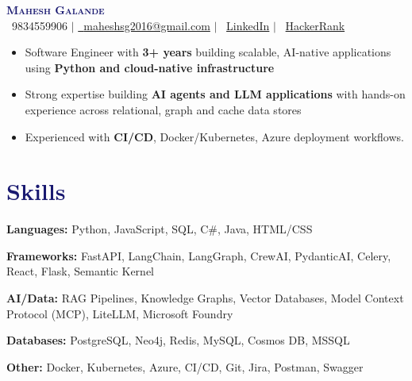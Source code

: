 \documentclass[letterpaper,11pt]{article}
\begin{document}
\begin{center}
    \textbf{\Huge \scshape \textcolor{MidnightBlue}{Mahesh Galande}} \\ \vspace{2pt}
    \small \faPhone\ {9834559906} $|$ \href{mailto:maheshsg2016@gmail.com}{\textcolor{BrickRed}{\faEnvelope\ {maheshsg2016@gmail.com}}} $|$ 
    \textcolor{BrickRed}{\faLinkedin\ \href{https://www.linkedin.com/in/mahesh-galande-235b09241/}{{LinkedIn}}} $|$ 
    \textcolor{BrickRed}{\faCode\ \href{https://www.hackerrank.com/profile/maheshsg2016}{HackerRank}}
\end{center}


\vspace{-4pt}

\begin{itemize}[leftmargin=0.15in, label={\textbullet}, itemsep=1pt]
    \small
    \item Software Engineer with \textbf{3+ years} building scalable, AI-native applications using \textbf{Python and cloud-native infrastructure}
    \item Strong expertise building \textbf{AI agents and LLM applications} with hands-on experience across relational, graph and cache data stores
    \item Experienced with \textbf{CI/CD}, Docker/Kubernetes, Azure deployment workflows.
\end{itemize}

\section{\textcolor{MidnightBlue}{Skills}}
\begin{itemize}[leftmargin=0.15in, label={}, itemsep=1pt]
\small{
\item \textbf{Languages:} Python, JavaScript, SQL, C\#, Java, HTML/CSS
\item \textbf{Frameworks:} FastAPI, LangChain, LangGraph, CrewAI, PydanticAI, Celery, React, Flask, Semantic Kernel
\item \textbf{AI/Data:} RAG Pipelines, Knowledge Graphs, Vector Databases, Model Context Protocol (MCP), LiteLLM, Microsoft Foundry
\item \textbf{Databases:} PostgreSQL, Neo4j, Redis, MySQL, Cosmos DB, MSSQL
\item \textbf{Other:} Docker, Kubernetes, Azure, CI/CD, Git, Jira, Postman, Swagger
}
\end{itemize}
\end{document}
